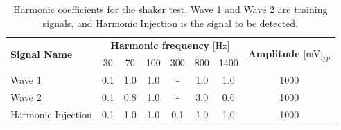 \begin{table}
    \centering
    \caption{Harmonic coefficients for the shaker test. Wave 1 and Wave 2 are training signals, and Harmonic Injection is the signal to be detected.}
    \label{tab:shaker_param_01}
    \begin{tabular}{lccccccc} 
    \toprule
    \multirow{2}{*}{\textbf{Signal Name }} & \multicolumn{6}{c}{\textbf{Harmonic frequency} [Hz]} & \multirow{2}{*}{\textbf{Amplitude} [mV]$_{pp}$} \\
     & 30 & 70 & 100 & 300 & 800 & 1400 &  \\ 
    \hline
    Wave 1 & 0.1 & 1.0 & 1.0 & \multicolumn{1}{c}{-} & 1.0 & 1.0 & 1000 \\
    Wave 2 & 0.1 & 0.8 & 1.0 & \multicolumn{1}{c}{-} & 3.0 & 0.6 & 1000 \\
    Harmonic Injection & 0.1 & 1.0 & 1.0 & 0.1 & 1.0 & 1.0 & 1000 \\
    \bottomrule
    \end{tabular}
    \end{table}

